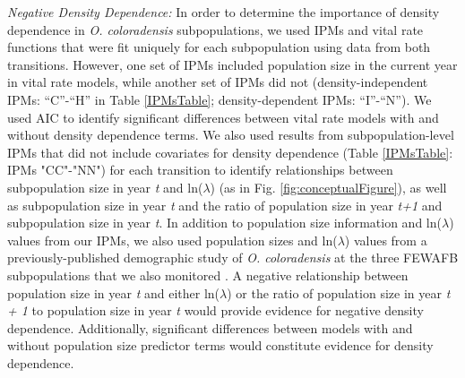 \documentclass[12pt, letterpaper]{article}
\begin{document}
\textit{Negative Density Dependence:} In order to determine the importance of density dependence in \textit{O. coloradensis} subpopulations, we used IPMs and vital rate functions that were fit uniquely for each subpopulation using data from both transitions. However, one set of IPMs included population size in the current year in vital rate models, while another set of IPMs did not (density-independent IPMs: “C”-“H” in Table \ref{IPMsTable}; density-dependent IPMs: “I”-“N”). We used AIC to identify significant differences between vital rate models with and without density dependence terms. We also used results from subpopulation-level IPMs that did not include covariates for density dependence (Table \ref{IPMsTable}: IPMs "CC"-"NN") for each transition to identify relationships between subpopulation size in year \textit{t}  and ln($\lambda$) (as in Fig. \ref{fig:conceptualFigure}), as well as subpopulation size in year \textit{t} and the ratio of population size in year \textit{t+1 }and subpopulation size in year \textit{t}. In addition to population size information and ln($\lambda$) values from our IPMs, we also used population sizes and ln($\lambda$) values from a previously-published demographic study of \textit{O. coloradensis} at the three FEWAFB subpopulations that we also monitored \cite{Floyd1998}.  A negative relationship between population size in year \textit{t} and either ln($\lambda$) or the ratio of population size in year \textit{t + 1} to population size in year \textit{t} would provide evidence for negative density dependence. Additionally, significant differences between models with and without population size predictor terms would constitute evidence for density dependence.  
\end{document}
